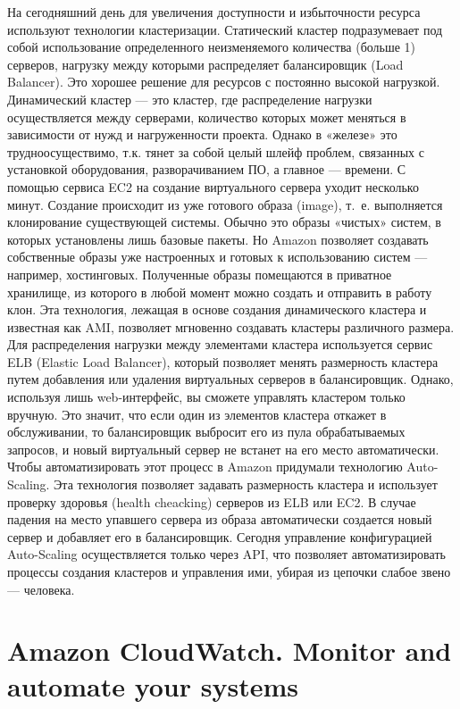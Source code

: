 \documentclass[10pt, a5paper]{article}
\begin{document}
На сегодняшний день для увеличения доступности и избыточности ресурса используют технологии кластеризации. Статический кластер подразумевает под собой использование определенного неизменяемого количества (больше 1) серверов, нагрузку между которыми распределяет балансировщик (Load Balancer). Это хорошее решение для ресурсов с постоянно высокой нагрузкой. Динамический кластер --- это кластер, где распределение нагрузки осуществляется между серверами, количество которых может меняться в зависимости от нужд и нагруженности проекта. Однако в «железе» это трудноосуществимо, т.к. тянет за собой целый шлейф проблем, связанных с установкой оборудования, разворачиванием ПО, а главное --- времени. С помощью сервиса EC2 на создание виртуального сервера уходит несколько минут. Создание происходит из уже готового образа (image), т.~е. выполняется клонирование существующей системы. Обычно это образы «чистых» систем, в которых установлены лишь базовые пакеты. Но Amazon позволяет создавать собственные образы уже настроенных и готовых к использованию систем --- например, хостинговых. Полученные образы помещаются в приватное хранилище, из которого в любой момент можно создать и отправить в работу клон. Эта технология, лежащая в основе создания динамического кластера и известная как AMI, позволяет мгновенно создавать кластеры различного размера. Для распределения нагрузки между элементами кластера используется сервис ELB (Elastic Load Balancer), который позволяет менять размерность кластера путем добавления или удаления виртуальных серверов в балансировщик. Однако, используя лишь web-интерфейс, вы сможете управлять кластером только вручную. Это значит, что если один из элементов кластера откажет в обслуживании, то балансировщик выбросит его из пула обрабатываемых запросов, и новый виртуальный сервер не встанет на его место автоматически. Чтобы автоматизировать этот процесс в Amazon придумали технологию Auto-Scaling. Эта технология позволяет задавать размерность кластера и использует проверку здоровья (health cheacking) серверов из ELB или EC2. В случае падения на место упавшего сервера из образа автоматически создается новый сервер и добавляет его в балансировщик. Сегодня управление конфигурацией Auto-Scaling осуществляется только через API, что позволяет автоматизировать процессы создания кластеров и управления ими, убирая из цепочки слабое звено --- человека.

\section*{Amazon CloudWatch. Monitor and automate your systems}
\end{document}
